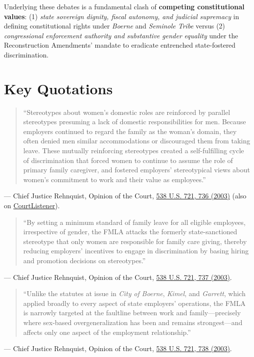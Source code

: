 \documentclass[12pt]{article}
\begin{document}
Underlying these debates is a fundamental clash of \textbf{competing constitutional values}: (1) \textit{state sovereign dignity, fiscal autonomy, and judicial supremacy} in defining constitutional rights under \textit{Boerne} and \textit{Seminole Tribe} versus (2) \textit{congressional enforcement authority and substantive gender equality} under the Reconstruction Amendments' mandate to eradicate entrenched state-fostered discrimination.

\section{Key Quotations}

\begin{quote}
``Stereotypes about women's domestic roles are reinforced by parallel stereotypes presuming a lack of domestic responsibilities for men. Because employers continued to regard the family as the woman's domain, they often denied men similar accommodations or discouraged them from taking leave. These mutually reinforcing stereotypes created a self-fulfilling cycle of discrimination that forced women to continue to assume the role of primary family caregiver, and fostered employers' stereotypical views about women's commitment to work and their value as employees.''
\end{quote}
\noindent --- Chief Justice Rehnquist, Opinion of the Court, \href{https://supreme.justia.com/cases/federal/us/538/721/}{538 U.S. 721, 736 (2003)} (also on \href{https://www.courtlistener.com/opinion/127926/nevada-department-of-human-resources-v-hibbs/}{CourtListener}).

\begin{quote}
``By setting a minimum standard of family leave for all eligible employees, irrespective of gender, the FMLA attacks the formerly state-sanctioned stereotype that only women are responsible for family care giving, thereby reducing employers' incentives to engage in discrimination by basing hiring and promotion decisions on stereotypes.''
\end{quote}
\noindent --- Chief Justice Rehnquist, Opinion of the Court, \href{https://supreme.justia.com/cases/federal/us/538/721/}{538 U.S. 721, 737 (2003)}.

\begin{quote}
``Unlike the statutes at issue in \textit{City of Boerne}, \textit{Kimel}, and \textit{Garrett}, which applied broadly to every aspect of state employers' operations, the FMLA is narrowly targeted at the faultline between work and family---precisely where sex-based overgeneralization has been and remains strongest---and affects only one aspect of the employment relationship.''
\end{quote}
\noindent --- Chief Justice Rehnquist, Opinion of the Court, \href{https://supreme.justia.com/cases/federal/us/538/721/}{538 U.S. 721, 738 (2003)}.
\end{document}
